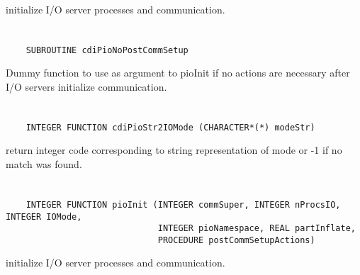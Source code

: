 initialize I/O server processes and communication.


\section*{\tt {}}

\begin{verbatim}
    SUBROUTINE cdiPioNoPostCommSetup
\end{verbatim}

Dummy function to use as argument to pioInit
if no actions are necessary after I/O servers initialize communication.


\section*{\tt {}}

\begin{verbatim}
    INTEGER FUNCTION cdiPioStr2IOMode (CHARACTER*(*) modeStr)
\end{verbatim}

return integer code corresponding to string
representation of mode or -1 if no match was found.


\section*{\tt {}}

\begin{verbatim}
    INTEGER FUNCTION pioInit (INTEGER commSuper, INTEGER nProcsIO, INTEGER IOMode,
                              INTEGER pioNamespace, REAL partInflate,
                              PROCEDURE postCommSetupActions)
\end{verbatim}

initialize I/O server processes and communication.


